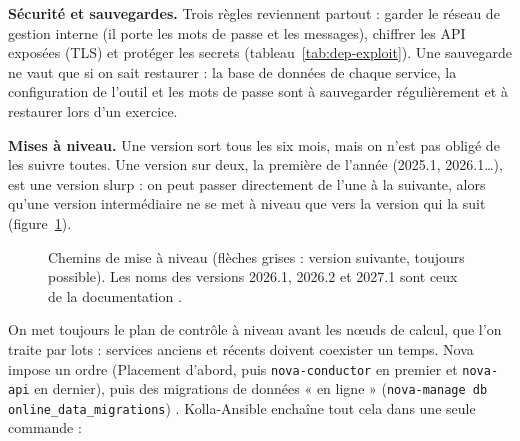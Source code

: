 \textbf{Sécurité et sauvegardes.} Trois règles reviennent partout : garder le réseau de gestion interne (il porte les mots de passe
et les messages), chiffrer les API exposées (TLS) et protéger les secrets (tableau~\ref{tab:dep-exploit}). Une sauvegarde ne vaut que
si on sait restaurer : la base de données de chaque service, la configuration de l'outil et les mots de passe sont à sauvegarder
régulièrement et à restaurer lors d'un exercice.

\textbf{Mises à niveau.} Une version sort tous les six mois, mais on n'est pas obligé de les suivre toutes. Une version sur deux,
la première de l'année (2025.1, 2026.1\dots), est une version \gls{slurp} : on peut passer directement de l'une à la suivante, alors
qu'une version intermédiaire ne se met à niveau que vers la version qui la suit \parencite{openstack-slurp} (figure~\ref{fig:dep-slurp}).

\begin{figure}[!ht]
\centering
{}
\caption{Chemins de mise à niveau (flèches grises : version suivante, toujours possible). Les noms des versions
2026.1, 2026.2 et 2027.1 sont ceux de la documentation \parencite{openstack-releases}.}
\label{fig:dep-slurp}
\end{figure}

On met toujours le plan de contrôle à niveau avant les nœuds de calcul, que l'on traite par lots : services anciens et récents
doivent coexister un temps. Nova impose un ordre (Placement d'abord, puis \texttt{nova-conductor} en premier et \texttt{nova-api} en
dernier), puis des migrations de données « en ligne » (\texttt{nova-manage db online\_data\_migrations}) \parencite{nova-upgrades}.
Kolla-Ansible enchaîne tout cela dans une seule commande \parencite{kolla-ansible-operating} :

